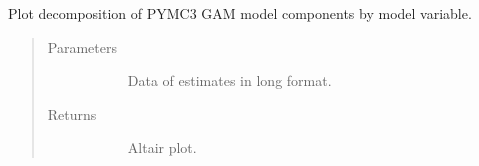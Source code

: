 \documentclass[letterpaper,10pt,english]{sphinxmanual}
\begin{document}
\begin{fulllineitems}
\label{\detokenize{autoapi/src/plot/altair/index:src.plot.altair.plot_decompose}}
Plot decomposition of PYMC3 GAM model components by model variable.
\begin{quote}\begin{description}
\item[{Parameters}] \leavevmode\begin{description}
\item[{}] \leavevmode{[}\sphinxcode{\sphinxupquote{pd.DataFrame}}{]}
Data of estimates in long format.

\end{description}

\item[{Returns}] \leavevmode\begin{description}
\item[{}] \leavevmode
Altair plot.

\end{description}

\end{description}\end{quote}

\end{fulllineitems}

\end{document}
